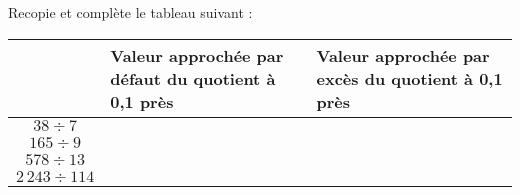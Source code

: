 Recopie et complète le tableau suivant :
\begin{center}
  \begin{tabular}{|c|m{6cm}|m{6cm}|}
    \cline{2-3}
    \multicolumn{1}{c|}{}&Valeur approchée par défaut du quotient à 0,1 près&Valeur approchée par excès du quotient à 0,1 près\\
\hline
$38\div7$&&\\
\hline
$165\div9$&&\\
\hline
$578\div13$&&\\
\hline
$2\,243\div114$&&\\
\hline
  \end{tabular}
\end{center}